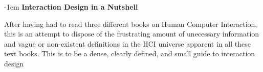 \newpage \thispagestyle{empty} %
\vspace*{3cm}
\begin{adjustwidth*}{}{-1cm}
  \noindent \textbf{Interaction Design in a Nutshell}

  \vspace*{4pt}
  
  \noindent After having had to read three different books on Human Computer Interaction, this is an attempt to dispose of the frustrating amount of unecessary information and vague or non-existent definitions in the HCI universe apparent in all these text books. This is to be a dense, clearly defined, and small guide to interaction design
\end{adjustwidth*}
